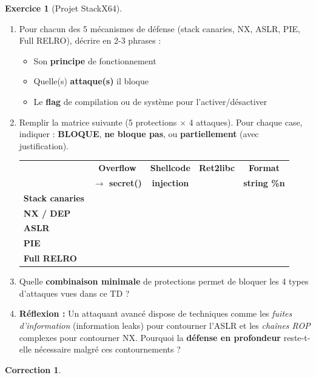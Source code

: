 \documentclass[a4paper,11pt]{article}
\theoremstyle{plain}
\newtheorem{correction}{Correction}
\theoremstyle{definition}
\newtheorem{exercice}{Exercice}
\begin{document}
\begin{exercice}[Projet StackX64]
\begin{enumerate}
\item[\textbf{6a)}] Pour chacun des 5 mécanismes de défense (stack canaries, NX, ASLR, PIE, Full RELRO), décrire en 2-3 phrases :
\begin{itemize}
    \item Son \textbf{principe} de fonctionnement
    \item Quelle(s) \textbf{attaque(s)} il bloque
    \item Le \textbf{flag} de compilation ou de système pour l'activer/désactiver
\end{itemize}

\item[\textbf{6b)}] Remplir la matrice suivante (5 protections $\times$ 4 attaques). Pour chaque case, indiquer : \textbf{BLOQUE}, \textbf{ne bloque pas}, ou \textbf{partiellement} (avec justification).

\begin{center}
\begin{tabular}{l|c|c|c|c}
\toprule
& \textbf{Overflow} & \textbf{Shellcode} & \textbf{Ret2libc} & \textbf{Format} \\
& \textbf{$\to$ secret()} & \textbf{injection} & & \textbf{string \%n} \\
\midrule
\textbf{Stack canaries} & & & & \\
\midrule
\textbf{NX / DEP} & & & & \\
\midrule
\textbf{ASLR} & & & & \\
\midrule
\textbf{PIE} & & & & \\
\midrule
\textbf{Full RELRO} & & & & \\
\bottomrule
\end{tabular}
\end{center}

\item[\textbf{6c)}] Quelle \textbf{combinaison minimale} de protections permet de bloquer les 4 types d'attaques vues dans ce TD ?

\item[\textbf{6d)}] \textbf{Réflexion :} Un attaquant avancé dispose de techniques comme les \textit{fuites d'information} (information leaks) pour contourner l'ASLR et les \textit{chaînes ROP} complexes pour contourner NX. Pourquoi la \textbf{défense en profondeur} reste-t-elle nécessaire malgré ces contournements ?
\end{enumerate}

\begin{correction}


\end{correction}
\end{exercice}
\end{document}
